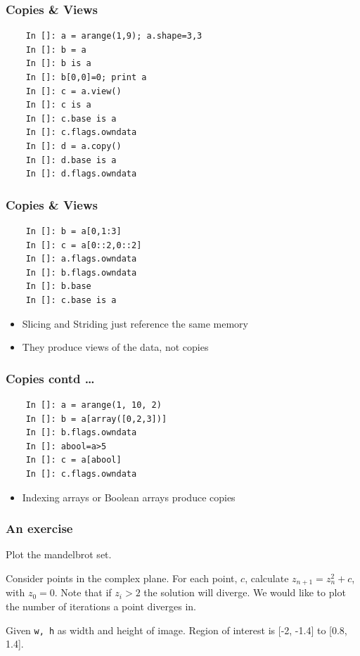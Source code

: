 \documentclass[14pt,compress]{beamer}
\newcounter{time}
\newcommand{\inctime}[1]{\addtocounter{time}{#1}{\tiny \thetime\ m}}
\newcommand{\typ}[1]{\lstinline{#1}}
\begin{document}
\begin{frame}[fragile]
  \frametitle{Copies \& Views}
  \vspace{-0.1in}
  \begin{lstlisting}
    In []: a = arange(1,9); a.shape=3,3
    In []: b = a
    In []: b is a
    In []: b[0,0]=0; print a
    In []: c = a.view()
    In []: c is a
    In []: c.base is a
    In []: c.flags.owndata
    In []: d = a.copy()
    In []: d.base is a
    In []: d.flags.owndata
  \end{lstlisting}
\end{frame}

\begin{frame}[fragile]
  \frametitle{Copies \& Views}
  \vspace{-0.1in}
  \begin{lstlisting}
    In []: b = a[0,1:3]
    In []: c = a[0::2,0::2]
    In []: a.flags.owndata
    In []: b.flags.owndata
    In []: b.base
    In []: c.base is a
  \end{lstlisting}
  \begin{itemize}
  \item Slicing and Striding just reference the same memory
  \item They produce views of the data, not copies
  \end{itemize}
\end{frame}

\begin{frame}[fragile]
  \frametitle{Copies contd \ldots}
  \begin{lstlisting}
    In []: a = arange(1, 10, 2)
    In []: b = a[array([0,2,3])]
    In []: b.flags.owndata
    In []: abool=a>5
    In []: c = a[abool]
    In []: c.flags.owndata
  \end{lstlisting}
  \begin{itemize}
  \item Indexing arrays or Boolean arrays produce copies
  \end{itemize}
\end{frame}


\begin{frame}[fragile]
  \frametitle{An exercise}

Plot the mandelbrot set. 

Consider points in the complex plane.  For each point, $c$, calculate
$z_{n+1} = z_n^2 + c$, with $z_0 = 0$.  Note that if $z_i > 2$ the
solution will diverge.  We would like to plot the number of iterations a
point diverges in.

Given \typ{w, h} as width and height of image.  Region of interest is
[-2, -1.4] to [0.8, 1.4].


\end{frame}
\end{document}

